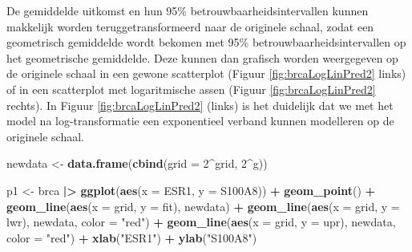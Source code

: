 \documentclass[
  12pt,dutch]{book}
\newenvironment{Shaded}{\begin{snugshade}}{\end{snugshade}}
\newcommand{\AttributeTok}[1]{\textcolor[rgb]{0.13,0.29,0.53}{#1}}
\newcommand{\DecValTok}[1]{\textcolor[rgb]{0.00,0.00,0.81}{#1}}
\newcommand{\FunctionTok}[1]{\textcolor[rgb]{0.13,0.29,0.53}{\textbf{#1}}}
\newcommand{\NormalTok}[1]{#1}
\newcommand{\OtherTok}[1]{\textcolor[rgb]{0.56,0.35,0.01}{#1}}
\newcommand{\SpecialCharTok}[1]{\textcolor[rgb]{0.81,0.36,0.00}{\textbf{#1}}}
\newcommand{\StringTok}[1]{\textcolor[rgb]{0.31,0.60,0.02}{#1}}
\theoremstyle{definition}
\theoremstyle{definition}
\theoremstyle{definition}
\theoremstyle{definition}
\theoremstyle{remark}
\begin{document}
De gemiddelde uitkomst en hun 95\% betrouwbaarheidsintervallen kunnen makkelijk worden teruggetransformeerd naar de originele schaal, zodat een geometrisch gemiddelde wordt bekomen met 95\% betrouwbaarheidsintervallen op het geometrische gemiddelde.
Deze kunnen dan grafisch worden weergegeven op de originele schaal in een gewone scatterplot (Figuur \ref{fig:brcaLogLinPred2} links) of in een scatterplot met logaritmische assen (Figuur \ref{fig:brcaLogLinPred2} rechts).
In Figuur \ref{fig:brcaLogLinPred2} (links) is het duidelijk dat we met het model na log-transformatie een exponentieel verband kunnen modelleren op de originele schaal.

\begin{Shaded}
\begin{Highlighting}[]
\NormalTok{newdata }\OtherTok{\textless{}{-}} \FunctionTok{data.frame}\NormalTok{(}\FunctionTok{cbind}\NormalTok{(}\AttributeTok{grid =} \DecValTok{2}\SpecialCharTok{\^{}}\NormalTok{grid, }\DecValTok{2}\SpecialCharTok{\^{}}\NormalTok{g))}

\NormalTok{p1 }\OtherTok{\textless{}{-}}\NormalTok{ brca }\SpecialCharTok{|\textgreater{}}
    \FunctionTok{ggplot}\NormalTok{(}\FunctionTok{aes}\NormalTok{(}\AttributeTok{x =}\NormalTok{ ESR1, }\AttributeTok{y =}\NormalTok{ S100A8)) }\SpecialCharTok{+} \FunctionTok{geom\_point}\NormalTok{() }\SpecialCharTok{+}
    \FunctionTok{geom\_line}\NormalTok{(}\FunctionTok{aes}\NormalTok{(}\AttributeTok{x =}\NormalTok{ grid, }\AttributeTok{y =}\NormalTok{ fit), newdata) }\SpecialCharTok{+} \FunctionTok{geom\_line}\NormalTok{(}\FunctionTok{aes}\NormalTok{(}\AttributeTok{x =}\NormalTok{ grid,}
    \AttributeTok{y =}\NormalTok{ lwr), newdata, }\AttributeTok{color =} \StringTok{"red"}\NormalTok{) }\SpecialCharTok{+} \FunctionTok{geom\_line}\NormalTok{(}\FunctionTok{aes}\NormalTok{(}\AttributeTok{x =}\NormalTok{ grid,}
    \AttributeTok{y =}\NormalTok{ upr), newdata, }\AttributeTok{color =} \StringTok{"red"}\NormalTok{) }\SpecialCharTok{+} \FunctionTok{xlab}\NormalTok{(}\StringTok{"ESR1"}\NormalTok{) }\SpecialCharTok{+}
    \FunctionTok{ylab}\NormalTok{(}\StringTok{"S100A8"}\NormalTok{)}


\end{Highlighting}
\end{Shaded}
\end{document}
